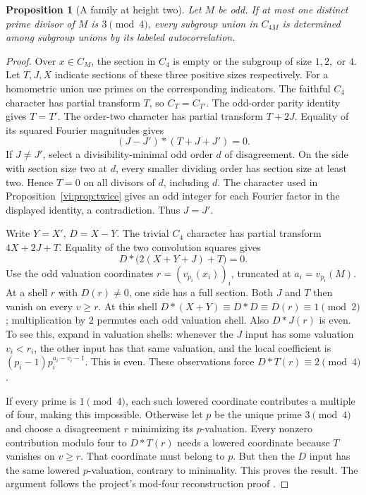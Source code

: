 \documentclass[11pt]{article}
\numberwithin{equation}{section}
\newtheorem{proposition}[theorem]{Proposition}
\theoremstyle{definition}
\theoremstyle{remark}
\begin{document}
\begin{proposition}[A family at height two]\label{prop:four}
Let $M$ be odd. If at most one distinct prime divisor of $M$ is $3\pmod4$, every subgroup union in $C_{4M}$ is determined among subgroup unions by its labeled autocorrelation.
\end{proposition}
\begin{proof}
Over $x\in C_M$, the section in $C_4$ is empty or the subgroup of size $1,2,$ or $4$. Let $T,J,X$ indicate sections of these three positive sizes respectively. For a homometric union use primes on the corresponding indicators. The faithful $C_4$ character has partial transform $T$, so $C_T=C_{T'}$. The odd-order parity identity gives $T=T'$. The order-two character has partial transform $T+2J$. Equality of its squared Fourier magnitudes gives
\[
 (J-J')*(T+J+J')=0.
\]
If $J\ne J'$, select a divisibility-minimal odd order $d$ of disagreement. On the side with section size two at $d$, every smaller dividing order has section size at least two. Hence $T=0$ on all divisors of $d$, including $d$. The character used in Proposition~\ref{vi:prop:twice} gives an odd integer for each Fourier factor in the displayed identity, a contradiction. Thus $J=J'$.

Write $Y=X'$, $D=X-Y$. The trivial $C_4$ character has partial transform $4X+2J+T$. Equality of the two convolution squares gives
\[
 D*\big(2(X+Y+J)+T\big)=0.
\]
Use the odd valuation coordinates $r=(v_{p_i}(x_i))_i$, truncated at $a_i=v_{p_i}(M)$. At a shell $r$ with $D(r)\ne0$, one side has a full section. Both $J$ and $T$ then vanish on every $v\ge r$. At this shell $D*(X+Y)\equiv D*D\equiv D(r)\equiv1\pmod2$; multiplication by $2$ permutes each odd valuation shell. Also $D*J(r)$ is even. To see this, expand in valuation shells: whenever the $J$ input has some valuation $v_i<r_i$, the other input has that same valuation, and the local coefficient is $(p_i-1)p_i^{a_i-v_i-1}$. This is even. These observations force $D*T(r)\equiv2\pmod4$.

If every prime is $1\pmod4$, each such lowered coordinate contributes a multiple of four, making this impossible. Otherwise let $p$ be the unique prime $3\pmod4$ and choose a disagreement $r$ minimizing its $p$-valuation. Every nonzero contribution modulo four to $D*T(r)$ needs a lowered coordinate because $T$ vanishes on $v\ge r$. That coordinate must belong to $p$. But then the $D$ input has the same lowered $p$-valuation, contrary to minimality. This proves the result. The argument follows the project's mod-four reconstruction proof \cite{HeightFour}.
\end{proof}
\end{document}
